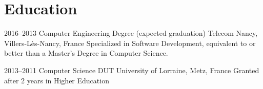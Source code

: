 \documentclass[]{friggeri-cv} %
\begin{document}


\section{Education}

\begin{entrylist}


\entry
{2016--2013}
{Computer Engineering Degree (expected graduation)}
{Telecom Nancy, Villers-Lès-Nancy, France}
{Specialized in Software Development, equivalent to or better than a Master's Degree in Computer Science.}


\entry
{2013--2011}
{Computer Science DUT}
{University of Lorraine, Metz, France}
{Granted after 2 years in Higher Education}


\end{entrylist}
\end{document}
